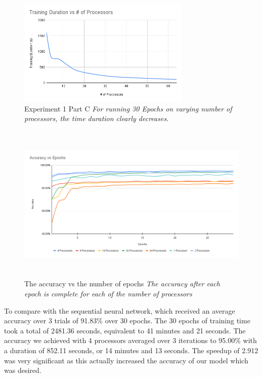 \documentclass[11pt,twocolumn]{article}
\begin{document}
\begin{figure}[t]
    \centerline{
        \includegraphics[height=2in]{Training Duration vs num of Processors.png}
    }
    \caption{
        \label{DurrvsProc}  Experiment 1 Part C {\em For running 30 Epochs on varying number of processors, the time duration clearly decreases.}
    }
\end{figure}


\begin{figure}
    \centering
    \includegraphics[width=\textwidth,height=3in]{Accuracy vs Epochs.png}
    \caption{\label{accvsepochs} The accuracy vs the number of epochs 
    {\em The accuracy after each epoch is complete for each of the number of processors}
    }
\end{figure}

 To compare with the sequential neural network, which received an average accuracy over 3 trials of 91.83\% over 30 epochs. The 30 epochs of training time took a total of 2481.36 seconds, equivalent to 41 minutes and 21 seconds. The accuracy we achieved with 4 processors averaged over 3 iterations to 95.00\% with a duration of 852.11 seconds, or 14 minutes and 13 seconds. The speedup of 2.912 was very significant as this actually increased the accuracy of our model which was desired.
\end{document}
